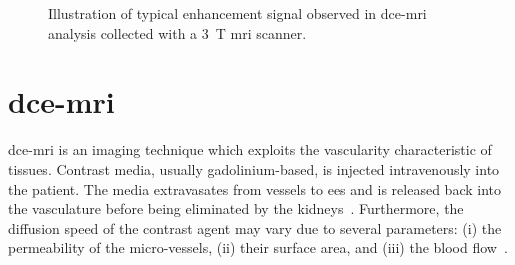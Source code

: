 \begin{figure}
\centering
	\hspace*{\fill}
	 \hfill
	\hspace*{\fill}
	\caption[Enhancement of \acs*{dce}-\acs*{mri} signal.]{Illustration of typical enhancement signal observed in \acs*{dce}-\acs*{mri} analysis collected with a \SI{3}{\tesla} \acs*{mri} scanner.}
	\label{fig:dceana}
\end{figure}

\section{\acs*{dce}-\acs*{mri}}\label{subsec:chp2:imaging:dce}
\ac{dce}-\ac{mri} is an imaging technique which exploits the vascularity characteristic of tissues.
Contrast media, usually gadolinium-based, is injected intravenously into the patient.
The media extravasates from vessels to \ac{ees} and is released back into the vasculature before being eliminated by the kidneys~\cite{Gribbestad2005}.
Furthermore, the diffusion speed of the contrast agent may vary due to several parameters: (i) the permeability of the micro-vessels, (ii) their surface area, and (iii) the blood flow~\cite{Padhani2002}.

